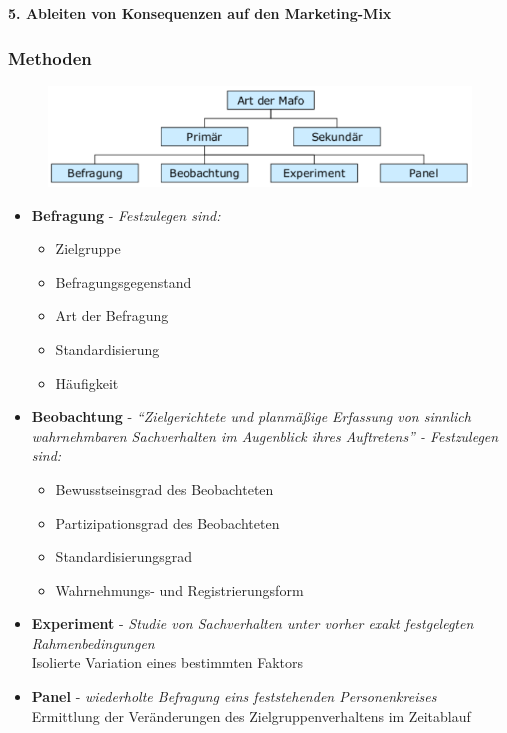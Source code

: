 \documentclass[a4paper,11pt, twoside]{article}
\begin{document}
\textbf{5. Ableiten von Konsequenzen auf den Marketing-Mix}

\subsubsection*{Methoden}

\begin{figure}[h]
 \begin{center}
   \includegraphics[scale=0.3]{bilder/methoden.png}
 \end{center}
\end{figure}
\begin{itemize}
	\item \textbf{Befragung} - \textit{Festzulegen sind:}
	\begin{itemize}
		\item Zielgruppe
		\item Befragungsgegenstand
		\item Art der Befragung
		\item Standardisierung
		\item Häufigkeit
	\end{itemize}

	\item \textbf{Beobachtung} - \textit{"`Zielgerichtete und planmäßige Erfassung von sinnlich wahrnehmbaren Sachverhalten im Augenblick ihres Auftretens"' - Festzulegen sind:}
	\begin{itemize}
		\item Bewusstseinsgrad des Beobachteten
		\item Partizipationsgrad des Beobachteten
		\item Standardisierungsgrad
		\item Wahrnehmungs- und Registrierungsform
	\end{itemize}

	\item \textbf{Experiment} - \textit{Studie von Sachverhalten unter vorher exakt festgelegten Rahmenbedingungen}\\
Isolierte Variation eines bestimmten Faktors

	\item \textbf{Panel} - \textit{wiederholte Befragung eins feststehenden Personenkreises}\\
Ermittlung der Veränderungen des Zielgruppenverhaltens im Zeitablauf
\end{itemize}
\end{document}
